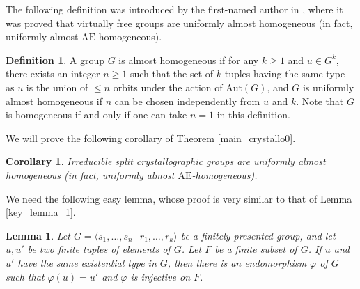 \documentclass[a4paper, 11pt]{amsart}
\newtheorem{co}[te]{Corollary}
\newtheorem{lemme}[te]{Lemma}
\theoremstyle{definition}
\newtheorem{de}[te]{Definition}
\theoremstyle{remark}
\renewcommand{\leq}{\leqslant}
\renewcommand{\geq}{\geqslant}
\begin{document}

The following definition was introduced by the first-named author in \cite{And18b}, where it was proved that virtually free groups are uniformly almost homogeneous (in fact, uniformly almost $\mathrm{AE}$-homogeneous).

\begin{de}
A group $G$ is almost homogeneous if for any $k\geq 1$ and $u\in G^k$, there exists an integer $n\geq 1$ such that the set of $k$-tuples having the same type as $u$ is the union of $\leq n$ orbits under the action of $\mathrm{Aut}(G)$, and $G$ is uniformly almost homogeneous if $n$ can be chosen independently from $u$ and $k$. Note that $G$ is homogeneous if and only if one can take $n= 1$ in this definition.\end{de}

We will prove the following corollary of Theorem \ref{main_crystallo0}.

\begin{co}\label{coro_almost_homogeneous}
Irreducible split crystallographic groups are uniformly almost homogeneous (in fact, uniformly almost $\mathrm{AE}$-homogeneous).
\end{co}

We need the following easy lemma, whose proof is very similar to that of Lemma \ref{key_lemma_1}.

\begin{lemme}\label{key_lemma_2}
Let $G=\langle s_1,\ldots,s_n\ \vert \ r_1,\ldots,r_k\rangle$ be a finitely presented group, and let $u,u'$ be two finite tuples of elements of $G$. Let $F$ be a finite subset of $G$. If $u$ and $u'$ have the same existential type in $G$, then there is an endomorphism $\varphi$ of $G$ such that $\varphi(u)=u'$ and $\varphi$ is injective on $F$.
\end{lemme}
\end{document}
